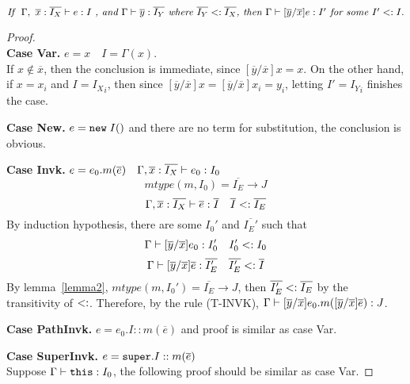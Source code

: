 \begin{lemma}~\label{lemma1}
$\textit{If } \ \judgeewf {\Gamma, \ \overline{x}:\overline{I_X}} { e : I } \textit{ , and }
\judgeewf {\Gamma} {\overline{y}:\overline{I_Y}} \textit{ where } \overline{I_Y} \subtype \overline{I_X}
\textit{, then } \judgeewf {\Gamma} {[\overline{y}/\overline{x}]e : I'} \textit{ for some } I' \subtype I.
$

\begin{proof}~\\
\noindent \textbf{Case Var.}
$ e = x \quad I = \Gamma(x) $. \\
If $x \notin \overline{x}$, then the conclusion is immediate, since $[\overline{y}/\overline{x}]x = x$.
On the other hand, if $x = x_i$ and $I = {I_X}_i$, then since $[\overline{y}/\overline{x}]x = [\overline{y}/\overline{x}]x_i = y_i$,
letting $I' = {I_Y}_i$ finishes the case.

\noindent \textbf{Case New.}
$e = \texttt{new} \; I()$ and there are no term for substitution, the conclusion is obvious.

\noindent \textbf{Case Invk.}
$ e = e_0.m(\overline{e}) \quad
  \Gamma, \overline{x}:\overline{I_X} \; {\vdash} \; e_0 : I_0 $
$$ mtype(m, I_0) = \overline{I_E} \rightarrow J $$
$$ \Gamma, \overline{x}:\overline{I_X} \; {\vdash} \; \overline{e}:\overline{I} \quad
    \overline{I} <: \overline{I_E} $$
By induction hypothesis, there are some $I_0'$ and $\overline{I_E'}$ such that
    $$ \Gamma \; {\vdash} \; [\overline{y}/\overline{x}]e_0 : I_0' \quad 
        I_0' <: I_0 $$
    $$ \Gamma \; {\vdash} \; [\overline{y}/\overline{x}]\overline{e} : \overline{I_E'} \quad  
        \overline{I_E'} <: \overline{I}$$    
By lemma~\ref{lemma2}, 
    $mtype(m, I_0') = \overline{I_E} \rightarrow J$,
then $\overline{I_E'} <: \overline{I_E}$ by the transitivity of $<:$.
Therefore, by the rule (T-INVK), 
    $\Gamma \; {\vdash} \; [\overline{y}/\overline{x}]e_0.m([\overline{y}/\overline{x}]\overline{e}) : J$.

\noindent \textbf{Case PathInvk.}
$ e = e_0.I::m(\overline{e}) $ and proof is similar as case Var.

\noindent \textbf{Case SuperInvk.}
$ e = \texttt{super}.I::m(\overline{e}) $ \\
Suppose $\Gamma \; {\vdash} \; \texttt{this} : I_0$, the following proof should be similar as case Var.
\end{proof}

\end{lemma}



